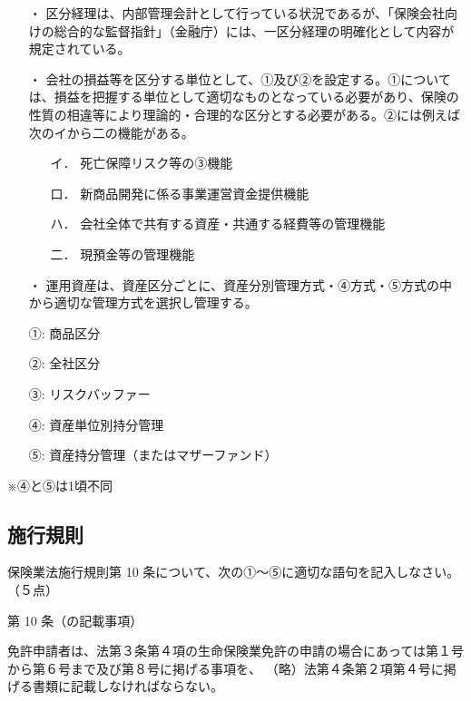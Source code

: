 \documentclass[report,gutter=10mm,fore-edge=10mm,uplatex,dvipdfmx]{jlreq}
\begin{document}
\begin{itemize}
\item[・] 区分経理は、内部管理会計として行っている状況であるが、「保険会社向けの総合的な監督指針」（金融庁）には、一区分経理の明確化として内容が規定されている。
\item[・] 会社の損益等を区分する単位として、①及び②を設定する。①については、損益を把握する単位として適切なものとなっている必要があり、保険の性質の相違等により理論的・合理的な区分とする必要がある。②には例えば次のイから二の機能がある。
\begin{itemize}
\item[イ．] 死亡保障リスク等の③機能
\item[口．] 新商品開発に係る事業運営資金提供機能
\item[ハ．] 会社全体で共有する資産・共通する経費等の管理機能
\item[二．] 現預金等の管理機能
\end{itemize}
\item[・]運用資産は、資産区分ごとに、資産分別管理方式・④方式・⑤方式の中から適切な管理方式を選択し管理する。
\end{itemize}

\answer{}
\begin{itemize}
\item[①:] 商品区分
\item[②:] 全社区分
\item[③:] リスクバッファー
\item[④:] 資産単位別持分管理
\item[⑤:] 資産持分管理（またはマザーファンド）
\end{itemize}
※④と⑤は1頃不同


\subsection{施行規則}

保険業法施行規則第 10 条について、次の①～⑤に適切な語句を記入しなさい。（５点）

第 10 条（の記載事項）

免許申請者は、法第３条第４項の生命保険業免許の申請の場合にあっては第１号から第６号まで及び第８号に掲げる事項を、
（略）法第４条第２項第４号に掲げる書類に記載しなければならない。
\end{document}
